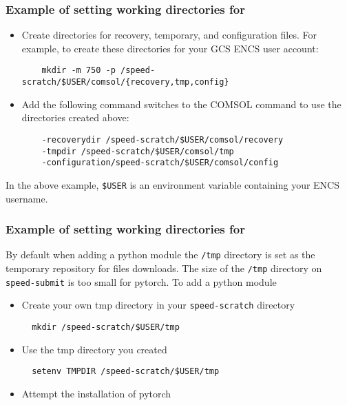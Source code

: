 \subsubsection{Example of setting working directories for }

\begin{itemize}
	\item 
	Create directories for recovery, temporary, and configuration files. 
	For example, to create these directories for your GCS ENCS user account:
	\begin{verbatim}
	mkdir -m 750 -p /speed-scratch/$USER/comsol/{recovery,tmp,config}
	\end{verbatim}
	\item
	Add the following command switches to the COMSOL command to use the 
	directories created above:
	\begin{verbatim} 
	-recoverydir /speed-scratch/$USER/comsol/recovery 
	-tmpdir /speed-scratch/$USER/comsol/tmp
	-configuration/speed-scratch/$USER/comsol/config
	\end{verbatim}
\end{itemize} 
In the above example, \verb!$USER! is an environment variable containing your ENCS username.

\subsubsection{Example of setting working directories for }

By default when adding a python module the \texttt{/tmp} directory is set as the temporary repository for files downloads. 
The size of the \texttt{/tmp} directory on \verb!speed-submit! is too small for pytorch.
To add a python module
\begin{itemize}
    \item 	
	Create your own tmp directory in your \verb!speed-scratch! directory
	\begin{verbatim} 
  mkdir /speed-scratch/$USER/tmp
	\end{verbatim}
	\item
  Use the tmp directory you created
	\begin{verbatim} 
  setenv TMPDIR /speed-scratch/$USER/tmp
	\end{verbatim}
    \item
	Attempt the installation of pytorch
\end{itemize}

